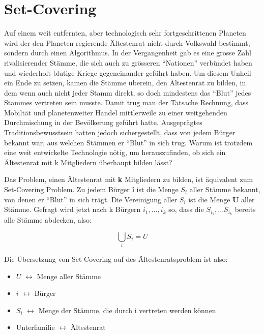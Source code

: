 \section{Set-Covering}

Auf einem weit entfernten, aber technologisch sehr fortgeschrittenen Planeten wird der den Planeten regierende Ältestenrat nicht durch Volkswahl bestimmt, sondern durch einen Algorithmus. In der Vergangenheit gab es eine grosse Zahl rivalisierender Stämme, die sich auch zu grösseren “Nationen” verbündet haben und wiederholt blutige Kriege gegeneinander geführt haben. Um diesem Unheil ein Ende zu setzen, kamen die Stämme überein, den Ältestenrat zu bilden, in dem wenn auch nicht jeder Stamm direkt, so doch mindestens das “Blut” jedes Stammes vertreten sein musste. Damit trug man der Tatsache Rechnung, dass Mobiltät und planetenweiter Handel mittlerweile zu einer weitgehenden Durchmischung in der Bevölkerung geführt hatte. Ausgeprägtes Traditionsbewusstsein hatten jedoch sichergestellt, dass von jedem Bürger bekannt war, aus welchen Stämmen er “Blut” in sich trug. Warum ist trotzdem eine weit entwickelte Technologie nötig, um herauszufinden, ob sich ein Ältestenrat mit k Mitgliedern überhaupt bilden lässt?

Das Problem, einen Ältestenrat mit \textbf{k} Mitgliedern zu bilden, ist äquivalent zum Set-Covering Problem. Zu jedem Bürger \textbf{i} ist die Menge \textbf{$S_i$} aller Stämme bekannt, von denen er “Blut” in sich trägt. Die Vereinigung aller $S_i$ ist die Menge \textbf{U} aller Stämme. Gefragt wird jetzt nach k Bürgern $i_1, ... , i_k$ so, dass die $S_{i_{1}}, ... S_{i_{k}}$ bereits alle Stämme abdecken, also:

$$\bigcup_{i} S_i = U$$

Die Übersetzung von Set-Covering auf des Ältestenratsproblem ist also:
\begin{itemize}
\item $U$ $\leftrightarrow$ Menge aller Stämme
\item $i$ $\leftrightarrow$ Bürger
\item $S_i$ $\leftrightarrow$ Menge der Stämme, die durch i vertreten werden können
\item Unterfamilie $\leftrightarrow$ Ältestenrat
\end{itemize}
